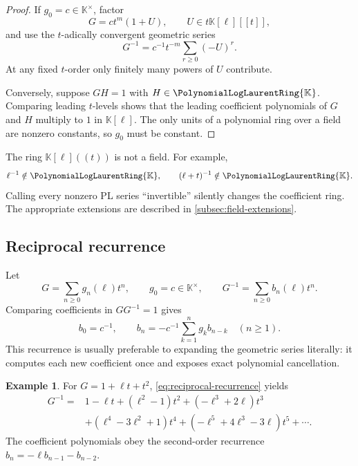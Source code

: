 \documentclass[11pt,oneside]{article}
\numberwithin{equation}{section}
\theoremstyle{definition}
\newtheorem{example}[theorem]{Example}
\newcommand{\K}{\mathbb{K}}
\newcommand{\PL}{\PolynomialLogLaurentRing{\K}}
\begin{document}
\begin{proof}
If \(g_0=c\in\K^\times\), factor
\[
  G=c t^m(1+U),\qquad U\in t\K[\ell][[t]],
\]
and use the \(t\)-adically convergent geometric series
\begin{equation}\label{eq:geometric-reciprocal}
  G^{-1}=c^{-1}t^{-m}\sum_{r\ge0}(-U)^r.
\end{equation}
At any fixed \(t\)-order only finitely many powers of \(U\) contribute.

Conversely, suppose \(GH=1\) with \(H\in\PL\).  Comparing leading
\(t\)-levels shows that the leading coefficient polynomials of \(G\) and \(H\)
multiply to \(1\) in \(\K[\ell]\).  The only units of a polynomial ring over a
field are nonzero constants, so \(g_0\) must be constant.
\end{proof}

\begin{warningbox}
The ring \(\K[\ell]((t))\) is not a field.  For example,
\[
  \ell^{-1}\notin\PL,
  \qquad
  (\ell+t)^{-1}\notin\PL.
\]
Calling every nonzero PL series ``invertible'' silently changes the coefficient
ring.  The appropriate extensions are described in
\cref{subsec:field-extensions}.
\end{warningbox}

\subsection{Reciprocal recurrence}

Let
\[
  G=\sum_{n\ge0}g_n(\ell)t^n,
  \qquad g_0=c\in\K^\times,
  \qquad
  G^{-1}=\sum_{n\ge0}b_n(\ell)t^n.
\]
Comparing coefficients in \(GG^{-1}=1\) gives
\begin{equation}\label{eq:reciprocal-recurrence}
  b_0=c^{-1},
  \qquad
  b_n=-c^{-1}\sum_{k=1}^{n}g_kb_{n-k}
  \quad(n\ge1).
\end{equation}
This recurrence is usually preferable to expanding the geometric series
literally: it computes each new coefficient once and exposes exact polynomial
cancellation.

\begin{example}
For \(G=1+\ell t+t^2\), \eqref{eq:reciprocal-recurrence} yields
\begin{align*}
 G^{-1}={}&1-\ell t+(\ell^2-1)t^2+(-\ell^3+2\ell)t^3\\
 &+(\ell^4-3\ell^2+1)t^4
 +(-\ell^5+4\ell^3-3\ell)t^5+\cdots.
\end{align*}
The coefficient polynomials obey the second-order recurrence
\(b_n=-\ell b_{n-1}-b_{n-2}\).
\end{example}
\end{document}
